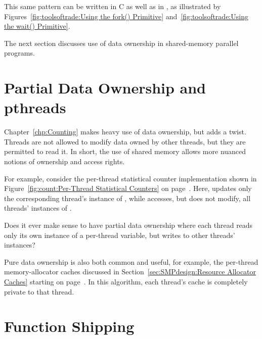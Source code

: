 This same pattern can be written in C as well as in , as illustrated by
Figures~\ref{fig:toolsoftrade:Using the fork() Primitive}
and~\ref{fig:toolsoftrade:Using the wait() Primitive}.

The next section discusses use of data ownership in shared-memory
parallel programs.

\section{Partial Data Ownership and pthreads}
\label{sec:owned:Partial Data Ownership and pthreads}

Chapter~\ref{chp:Counting} makes heavy use of data ownership,
but adds a twist.
Threads are not allowed to modify data owned by other threads,
but they are permitted to read it.
In short, the use of shared memory allows more nuanced notions
of ownership and access rights.

For example, consider the per-thread statistical counter implementation
shown in
Figure~\ref{fig:count:Per-Thread Statistical Counters} on
page~\pageref{fig:count:Per-Thread Statistical Counters}.
Here,  updates only the corresponding thread's
instance of ,
while  accesses, but does not modify, all
threads' instances of .

\QuickQuiz{}
	Does it ever make sense to have partial data ownership where
	each thread reads only its own instance of a per-thread variable,
	but writes to other threads' instances?
 \QuickQuizEnd

Pure data ownership is also both common and useful, for example, the
per-thread memory-allocator caches discussed in
Section~\ref{sec:SMPdesign:Resource Allocator Caches}
starting on
page~\pageref{sec:SMPdesign:Resource Allocator Caches}.
In this algorithm, each thread's cache is completely private to that
thread.

\section{Function Shipping}
\label{sec:owned:Function Shipping}

